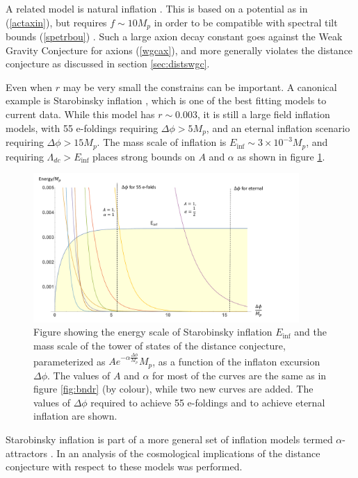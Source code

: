 \documentclass[11pt,a4paper]{article}
\numberwithin{equation}{section}
\numberwithin{table}{section}\setlength{\multlinegap}{25pt}
\begin{document}
A related model is natural inflation \cite{Freese:1990rb}. This is based on a potential as in (\ref{actaxin}), but requires $f \sim 10 M_p$ in order to be compatible with spectral tilt bounds (\ref{spetrbou}) \cite{Baumann:2014nda}. Such a large axion decay constant goes against the Weak Gravity Conjecture for axions (\ref{wgcax}), and more generally violates the distance conjecture as discussed in section \ref{sec:distswgc}.  

Even when $r$ may be very small the constrains can be important. A canonical example is Starobinsky inflation \cite{STAROBINSKY198099}, which is one of the best fitting models to current data. While this model has $r \sim 0.003$, it is still a large field inflation models, with 55 e-foldings requiring $\Delta \phi > 5 M_p$, and an eternal inflation scenario requiring $\Delta \phi > 15 M_p$. The mass scale of inflation is $E_{\mathrm{inf}}  \sim 3\times10^{-3} M_p$, and requiring $\Lambda_{dc} > E_{\mathrm{inf}}$ places strong bounds on $A$ and $\alpha$ as shown in figure \ref{fig:starbounds}.
\begin{figure}[t]
\centering
 \includegraphics[width=0.9\textwidth]{starbounds.pdf}
\caption{Figure showing the energy scale of Starobinsky inflation $E_{\mathrm{inf}}$ and the mass scale of the tower of states of the distance conjecture, parameterized as $A e^{-\alpha \frac{\Delta \phi}{M_p}} M_p$, as a function of the inflaton excursion $\Delta \phi$. The values of $A$ and $\alpha$ for most of the curves are the same as in figure \ref{fig:bndr} (by colour), while two new curves are added. The values of $\Delta \phi$ required to achieve 55 e-foldings and to achieve eternal inflation are shown.}
\label{fig:starbounds}
\end{figure}

Starobinsky inflation is part of a more general set of inflation models termed $\alpha$-attractors \cite{Kallosh:2013yoa,Galante:2014ifa,Roest:2015qya}. In \cite{Scalisi:2018eaz} an analysis of the cosmological implications of the distance conjecture with respect to these models was performed.
\end{document}

